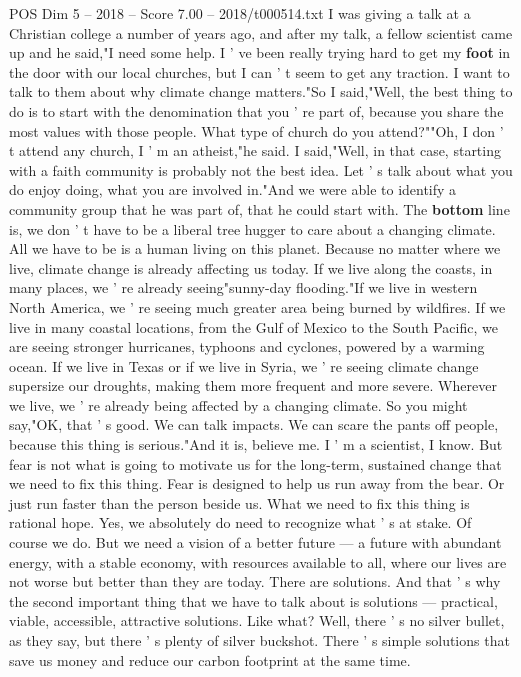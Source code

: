 \begin{textsample}{POS Dim 5 – 2018 – Score 7.00 – 2018/t000514.txt}
I was giving a talk at a Christian college a number of years ago, and after my talk, a fellow scientist came up and he said,"I need some help.
I ' ve been really trying hard to get my \textbf{foot} in the door with our local churches, but I can ' t seem to get any traction.
I want to talk to them about why climate change matters."So I said,"Well, the best thing to do is to start with the denomination that you ' re part of, because you share the most values with those people.
What type of church do you attend?""Oh, I don ' t attend any church, I ' m an atheist,"he said.
I said,"Well, in that case, starting with a faith community is probably not the best idea.
Let ' s talk about what you do enjoy doing, what you are involved in."And we were able to identify a community group that he was part of, that he could start with.
The \textbf{bottom} line is, we don ' t have to be a liberal tree hugger to care about a changing climate.
All we have to be is a human living on this planet.
Because no matter where we live, climate change is already affecting us today.
If we live along the coasts, in many places, we ' re already seeing"sunny-day flooding."If we live in western North America, we ' re seeing much greater area being burned by wildfires.
If we live in many coastal locations, from the Gulf of Mexico to the South Pacific, we are seeing stronger hurricanes, typhoons and cyclones, powered by a warming ocean.
If we live in Texas or if we live in Syria, we ' re seeing climate change supersize our droughts, making them more frequent and more severe.
Wherever we live, we ' re already being affected by a changing climate.
So you might say,"OK, that ' s good.
We can talk impacts.
We can scare the pants off people, because this thing is serious."And it is, believe me.
I ' m a scientist, I know.
But fear is not what is going to motivate us for the long-term, sustained change that we need to fix this thing.
Fear is designed to help us run away from the bear.
Or just run faster than the person beside us.
What we need to fix this thing is rational hope.
Yes, we absolutely do need to recognize what ' s at stake.
Of course we do.
But we need a vision of a better future — a future with abundant energy, with a stable economy, with resources available to all, where our lives are not worse but better than they are today.
There are solutions.
And that ' s why the second important thing that we have to talk about is solutions — practical, viable, accessible, attractive solutions.
Like what?
Well, there ' s no silver bullet, as they say, but there ' s plenty of silver buckshot.
There ' s simple solutions that save us money and reduce our carbon footprint at the same time.

\end{textsample}
